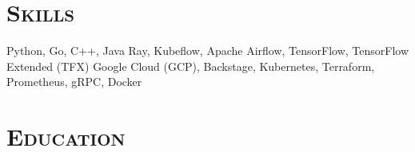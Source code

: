\documentclass[alternative,10pt,compact]{yaac-another-awesome-cv}
\newcommand\sectionHeader[1]{\section{\texorpdfstring{\color{accentcolor}\textsc{#1}}{#1}}}
\begin{document}
\sectionHeader{Skills}

\begin{keywords}
  {
    Python,
    Go,
    C++,
    Java
  }
  {
    Ray,
    Kubeflow,
    Apache Airflow,
    TensorFlow,
    TensorFlow Extended (TFX)
  }
  {
    Google Cloud (GCP),
    Backstage,
    Kubernetes,
    Terraform,
    Prometheus,
    gRPC,
    Docker
  }
\end{keywords}

\sectionHeader{Education}

\begin{scholarship}
\end{scholarship}
\end{document}
